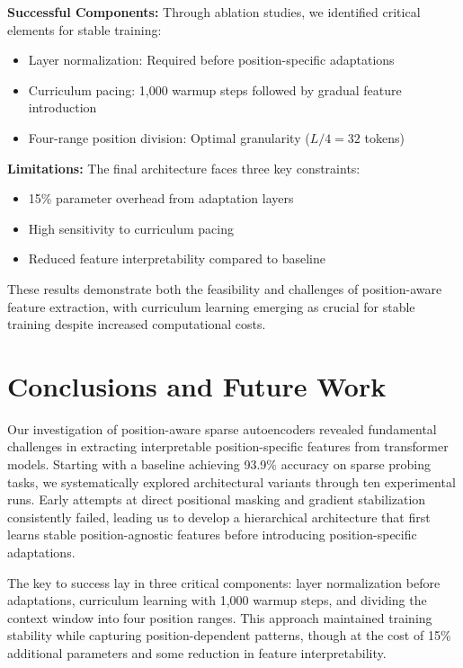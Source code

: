 \documentclass{article} %
\begin{document}
\textbf{Successful Components:} Through ablation studies, we identified critical elements for stable training:
\begin{itemize}
    \item Layer normalization: Required before position-specific adaptations
    \item Curriculum pacing: 1,000 warmup steps followed by gradual feature introduction
    \item Four-range position division: Optimal granularity ($L/4 = 32$ tokens)
\end{itemize}

\textbf{Limitations:} The final architecture faces three key constraints:
\begin{itemize}
    \item 15\% parameter overhead from adaptation layers
    \item High sensitivity to curriculum pacing
    \item Reduced feature interpretability compared to baseline
\end{itemize}

These results demonstrate both the feasibility and challenges of position-aware feature extraction, with curriculum learning emerging as crucial for stable training despite increased computational costs.

\section{Conclusions and Future Work}
\label{sec:conclusion}

Our investigation of position-aware sparse autoencoders revealed fundamental challenges in extracting interpretable position-specific features from transformer models. Starting with a baseline achieving 93.9\% accuracy on sparse probing tasks, we systematically explored architectural variants through ten experimental runs. Early attempts at direct positional masking and gradient stabilization consistently failed, leading us to develop a hierarchical architecture that first learns stable position-agnostic features before introducing position-specific adaptations.

The key to success lay in three critical components: layer normalization before adaptations, curriculum learning with 1,000 warmup steps, and dividing the context window into four position ranges. This approach maintained training stability while capturing position-dependent patterns, though at the cost of 15\% additional parameters and some reduction in feature interpretability.
\end{document}
